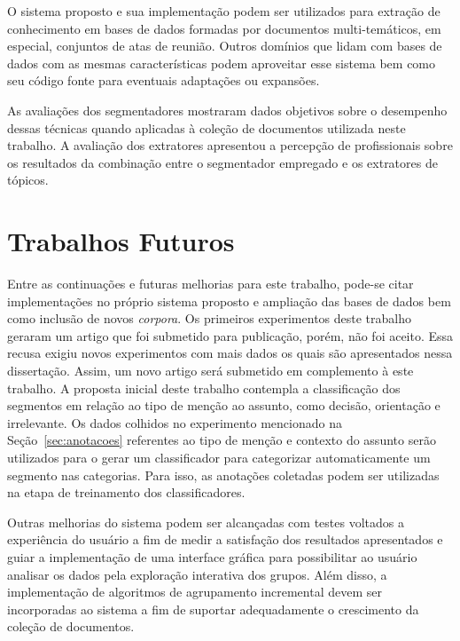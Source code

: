 O sistema proposto e sua implementação podem ser utilizados para extração de conhecimento em bases de dados formadas por documentos multi-temáticos, em especial, conjuntos de atas de reunião. Outros domínios que lidam com bases de dados com as mesmas características podem aproveitar esse sistema bem como seu código fonte para eventuais adaptações ou expansões.
 
As avaliações dos segmentadores mostraram dados objetivos sobre o desempenho dessas técnicas quando aplicadas à coleção de documentos utilizada neste trabalho. 
A avaliação dos extratores apresentou a percepção de profissionais sobre os resultados da combinação entre o segmentador empregado e os extratores de tópicos.







\section{Trabalhos Futuros}	

Entre as continuações e futuras melhorias para este trabalho, pode-se citar implementações no próprio sistema proposto e ampliação das bases de dados bem como inclusão de novos \textit{corpora}.  
%
Os primeiros experimentos deste trabalho geraram um artigo que foi submetido para publicação, porém, não foi aceito. Essa recusa exigiu novos experimentos com mais dados os quais são apresentados nessa dissertação. Assim, um novo artigo será submetido em complemento à este trabalho.
% 
A proposta inicial deste trabalho contempla a classificação dos segmentos em relação ao tipo de menção ao assunto, como decisão, orientação e irrelevante. Os dados colhidos no experimento mencionado na Seção~\ref{sec:anotacoes} referentes ao tipo de menção e contexto do assunto serão utilizados para o gerar um classificador para categorizar automaticamente um segmento nas categorias. Para isso, as anotações coletadas podem ser utilizadas na etapa de treinamento dos classificadores.

%
Outras melhorias do sistema podem ser alcançadas com testes voltados a experiência do usuário a fim de medir a satisfação dos resultados apresentados e guiar a implementação de uma interface gráfica para possibilitar ao usuário analisar os dados pela exploração interativa dos grupos. Além disso, a implementação de algoritmos de agrupamento incremental devem ser incorporadas ao sistema a fim de suportar adequadamente o crescimento da coleção de documentos.
%

